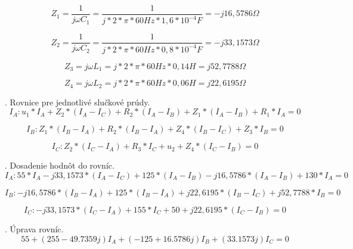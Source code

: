 \documentclass[a4paper,12pt]{article}
\begin{document}
\begin{equation}
Z_1  = \frac{1}{j\omega C_1}  = \frac{1}{j*2*\pi * 60Hz * 1,6*10^{-4}F} = -j16,5786\Omega
\end{equation}

\begin{equation}
Z_2  = \frac{1}{j\omega C_2}  = \frac{1}{j*2*\pi * 60Hz * 0,8*10^{-4}F} = -j33,1573\Omega
\end{equation}

\begin{equation}
Z_3  = j\omega L_1 = j*2*\pi * 60Hz * 0,14H = j52,7788\Omega
\end{equation}

\begin{equation}
Z_4  = j\omega L_2 = j*2*\pi * 60Hz * 0,06H = j22,6195\Omega
\end{equation}

. Rovnice pre jednotlivé slučkové prúdy.
\begin{equation}
I_A: u_1 * I_A + Z_2 * (I_A - I_C) + R_2 * (I_A - I_B) + Z_1 * (I_A - I_B) + R_1 * I_A = 0
\end{equation}

\begin{equation}
I_B: Z_1 * (I_B - I_A) + R_2 * (I_B - I_A) + Z_4 * (I_B - I_C) + Z_3 * I_B = 0
\end{equation}

\begin{equation}
I_C: Z_2 * (I_C - I_A) + R_3 * I_C + u_2 + Z_4 * (I_C - I_B) = 0
\end{equation}

. Dosadenie hodnôt do rovníc.
\begin{equation}
I_A: 55 * I_A -j33,1573 * (I_A - I_C) + 125 * (I_A - I_B) -j16,5786 * (I_A - I_B) + 130 * I_A = 0
\end{equation}

\begin{equation}
I_B: -j16,5786 * (I_B - I_A) + 125 * (I_B - I_A) + j22,6195 * (I_B - I_C) + j52,7788 * I_B = 0
\end{equation}

\begin{equation}
I_C: -j33,1573 * (I_C - I_A) + 155 * I_C + 50 + j22,6195 * (I_C - I_B) = 0
\end{equation}

. Úprava rovníc.
\begin{equation}
55 + (255 -49.7359j)I_A + (-125 + 16.5786j)I_B + (33.1573j)I_C = 0
\end{equation}
\end{document}
